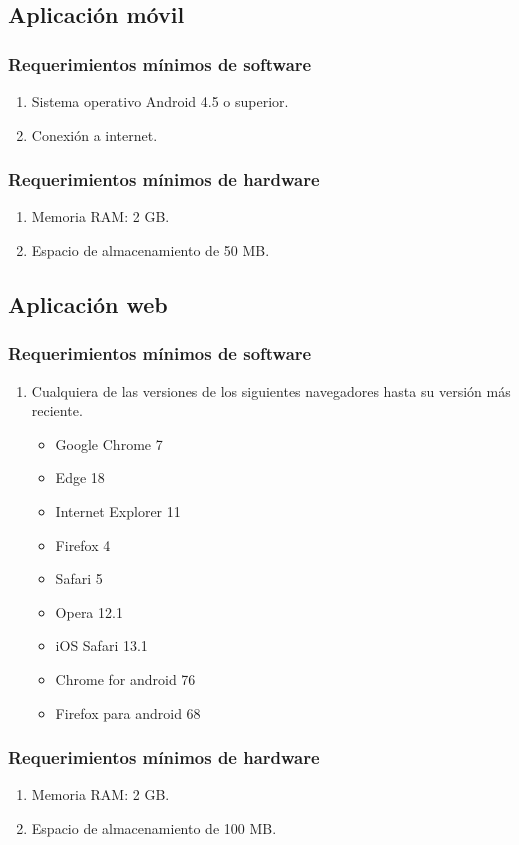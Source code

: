     \subsection{Aplicación móvil}
    \subsubsection{Requerimientos mínimos de software}
    \begin{enumerate}
        \item Sistema operativo Android 4.5 o superior.
        \item Conexión a internet.
    \end{enumerate}
    
    \subsubsection{Requerimientos mínimos de hardware}
    \begin{enumerate}
        \item Memoria RAM: 2 GB.
        \item Espacio de almacenamiento de 50 MB.
    \end{enumerate}
    \subsection{Aplicación web}
    \subsubsection{Requerimientos mínimos de software}
    \begin{enumerate}
        \item Cualquiera de las versiones de los siguientes navegadores hasta su versión más reciente.
        \begin{itemize}
            \item Google Chrome 7
            \item Edge 18
            \item Internet Explorer 11
            \item Firefox 4
            \item Safari 5
            \item Opera 12.1
            \item iOS Safari 13.1
            \item Chrome for android 76
            \item Firefox para android 68
        \end{itemize}
    \end{enumerate}
    \subsubsection{Requerimientos mínimos de hardware}
    \begin{enumerate}
        \item Memoria RAM: 2 GB.
        \item Espacio de almacenamiento de 100 MB.
    \end{enumerate}
